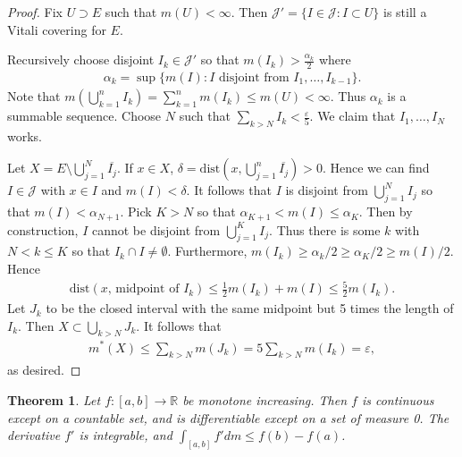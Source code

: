 \documentclass[11pt]{amsart}
\newtheorem{theorem}{Theorem}[section]
\theoremstyle{definition}
\numberwithin{equation}{section}
\begin{document}
\begin{proof}
    Fix $U\supset E$ such that $m(U)<\infty$. Then $\mathcal J'=\{I\in \mathcal J:I\subset U\}$ is still a Vitali covering for $E$.

    Recursively choose disjoint $I_k\in \mathcal J'$ so that $m(I_k)>\frac{\alpha_k}{2}$ where 
    \begin{align*}
        \alpha_k=\sup\{m(I):I\text{ disjoint from }I_1,\ldots, I_{k-1}\}.
    \end{align*}
    Note that $m(\bigcup_{k=1}^nI_k)=\sum_{k=1}^nm(I_k)\le m(U)<\infty$. Thus $\alpha_k$ is a summable sequence. Choose $N$ such that $\sum_{k>N}I_k<\frac{\varepsilon}{5}$. We claim that $I_1,\ldots,I_N$ works.

    Let $X=E\setminus \bigcup_{j=1}^N\overline{I_j}$. If $x\in X$, $\delta=\mathrm{dist}(x,\bigcup_{j=1}^n\overline{I_j})>0$. Hence we can find $I\in \mathcal J$ with $x\in I$ and $m(I)<\delta$. It follows that $I$ is disjoint from $\bigcup_{j=1}^NI_j$ so that $m(I)<\alpha_{N+1}$. Pick $K>N$ so that $\alpha_{K+1}<m(I)\le \alpha_K$. Then by construction, $I$ cannot be disjoint from $\bigcup_{j=1}^KI_j$. Thus there is some $k$ with $N<k\le K$ so that $I_k\cap I\ne\emptyset$. Furthermore, $m(I_k)\ge \alpha_k/2\ge \alpha_K/2\ge m(I)/2$. Hence
    \begin{align*}
        \mathrm{dist}(x,\,\text{midpoint of }I_k)\le\frac{1}{2}m(I_k)+m(I)\le \frac{5}{2}m(I_k).
    \end{align*}
    Let $J_k$ to be the closed interval with the same midpoint but 5 times the length of $I_k$. Then $X\subset \bigcup_{k>N}J_k$. It follows that
    \begin{align*}
        m^*(X)\le\sum_{k>N}m(J_k)=5\sum_{k>N}m(I_k)=\varepsilon,
    \end{align*}
    as desired.
\end{proof}
\begin{theorem}
    Let $f:[a,b]\to\mathbb R$ be monotone increasing. Then $f$ is continuous except on a countable set, and is differentiable except on a set of measure 0. The derivative $f'$ is integrable, and $\int_{[a,b]}f'dm\le f(b)-f(a)$.
\end{theorem}
\end{document}
